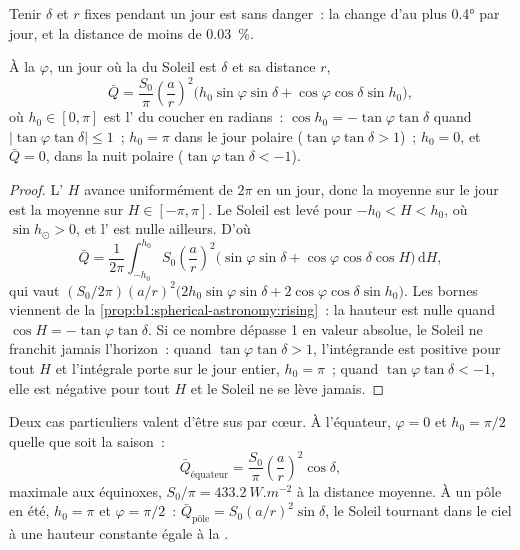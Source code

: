 Tenir $\delta$ et $r$ fixes pendant un jour est sans danger~: la  change
d'au plus \ang{0.4} par jour, et la distance de moins de \qty{0.03}{\percent}.

\begin{theorem}\label{thm:b1:radiation-heat-transport:daily}
À la  $\varphi$, un jour où la  du Soleil est $\delta$ et sa
distance $r$,
\[
  \bar Q = \frac{S_0}{\pi}\left(\frac{a}{r}\right)^{2}
  \bigl(h_0\sin\varphi\sin\delta + \cos\varphi\cos\delta\sin h_0\bigr),
\]
où $h_0 \in [0, \pi]$ est l' du coucher en radians~: $\cos h_0 =
-\tan\varphi\tan\delta$ quand $|\tan\varphi\tan\delta| \le 1$~; $h_0 = \pi$ dans le
jour polaire ($\tan\varphi\tan\delta > 1$)~; $h_0 = 0$, et $\bar Q = 0$, dans la nuit
polaire ($\tan\varphi\tan\delta < -1$).
\end{theorem}

\begin{proof}
L' $H$ avance uniformément de $2\pi$ en un jour, donc la moyenne sur
le jour est la moyenne sur $H \in [-\pi, \pi]$. Le Soleil est levé pour $-h_0 < H < h_0$,
où $\sin h_\odot > 0$, et l' est nulle ailleurs. D'où
\[
  \bar Q = \frac{1}{2\pi}\int_{-h_0}^{h_0} S_0\left(\frac{a}{r}\right)^{2}
  \bigl(\sin\varphi\sin\delta + \cos\varphi\cos\delta\cos H\bigr)\,\mathrm dH ,
\]
qui vaut $(S_0/2\pi)(a/r)^2\bigl(2h_0\sin\varphi\sin\delta +
2\cos\varphi\cos\delta\sin h_0\bigr)$.
Les bornes viennent de la \cref{prop:b1:spherical-astronomy:rising}~: la hauteur est
nulle quand $\cos H = -\tan\varphi\tan\delta$. Si ce nombre dépasse 1 en valeur
absolue, le Soleil ne franchit jamais l'horizon~: quand $\tan\varphi\tan\delta > 1$,
l'intégrande est positive pour tout $H$ et l'intégrale porte sur le jour entier,
$h_0 = \pi$~; quand $\tan\varphi\tan\delta < -1$, elle est négative pour tout $H$ et
le Soleil ne se lève jamais.
\end{proof}

Deux cas particuliers valent d'être sus par cœur. À l'équateur, $\varphi = 0$ et
$h_0 = \pi/2$ quelle que soit la saison~:
\[
  \bar Q_\text{équateur} = \frac{S_0}{\pi}\left(\frac{a}{r}\right)^{2}\cos\delta ,
\]
maximale aux équinoxes, $S_0/\pi = \qty{433.2}{W.m^{-2}}$ à la distance moyenne.
À un pôle en été, $h_0 = \pi$ et $\varphi = \pi/2$~: $\bar Q_\text{pôle} =
S_0(a/r)^2\sin\delta$, le Soleil tournant dans le ciel à une hauteur constante égale à
la .

